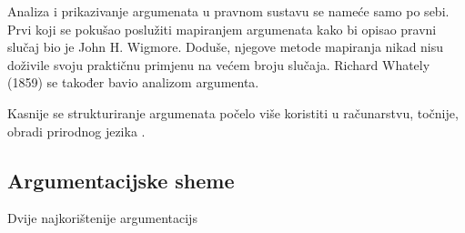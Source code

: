 Analiza i prikazivanje argumenata u pravnom sustavu se nameće samo po sebi. Prvi koji se pokušao poslužiti mapiranjem argumenata kako bi opisao pravni slučaj bio je John H. Wigmore. Doduše, njegove metode mapiranja nikad nisu doživile svoju praktičnu primjenu na većem broju slučaja. Richard Whately (1859) se također bavio analizom argumenta.

Kasnije se strukturiranje argumenata počelo više koristiti u računarstvu, točnije, obradi prirodnog jezika \citep{reed2003argumentation}. 

\subsection{Argumentacijske sheme}


Dvije najkorištenije argumentacijs
